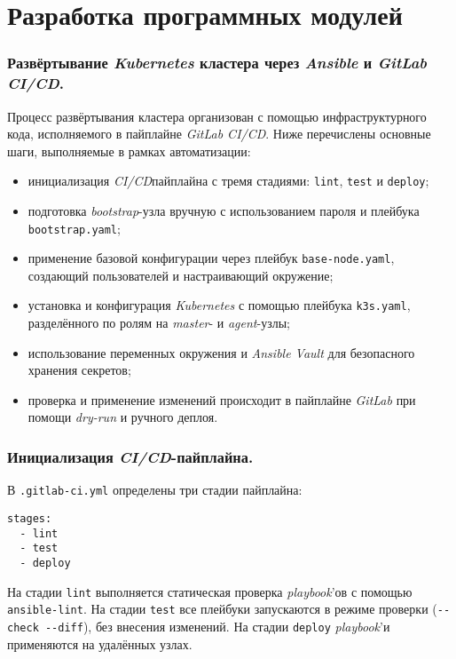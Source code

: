 \section{Разработка программных модулей}
\subsubsection{Развёртывание \textit{Kubernetes} кластера через \textit{Ansible} и \textit{GitLab CI/CD}.} Процесс развёртывания  кластера организован с помощью инфраструктурного кода, исполняемого в пайплайне \textit{GitLab CI/CD}. Ниже перечислены основные шаги, выполняемые в рамках автоматизации:

\begin{itemize}
  \item инициализация \textit{CI/CD}пайплайна с тремя стадиями: \lstinline{lint}, \lstinline{test} и \lstinline{deploy};
  \item подготовка \textit{bootstrap}-узла вручную с использованием пароля и плейбука \lstinline{bootstrap.yaml};
  \item применение базовой конфигурации через плейбук \lstinline{base-node.yaml}, создающий пользователей и настраивающий окружение;
  \item установка и конфигурация \textit{Kubernetes} с помощью плейбука \lstinline{k3s.yaml}, разделённого по ролям на \textit{master}- и \textit{agent}-узлы;
  \item использование переменных окружения и \textit{Ansible Vault} для безопасного хранения секретов;
  \item проверка и применение изменений происходит в пайплайне \textit{GitLab} при помощи \textit{dry-run} и ручного деплоя.
\end{itemize}

\subsubsection{Инициализация \textit{CI/CD}-пайплайна.} В \lstinline{.gitlab-ci.yml} определены три стадии пайплайна:

\begin{lstlisting}
stages:
  - lint
  - test
  - deploy
\end{lstlisting}

На стадии \lstinline{lint} выполняется статическая проверка \textit{playbook}'ов с помощью \lstinline{ansible-lint}. На стадии \lstinline{test} все плейбуки запускаются в режиме проверки (\lstinline{--check --diff}), без внесения изменений. На стадии \lstinline{deploy} \textit{playbook}'и применяются на удалённых узлах.

